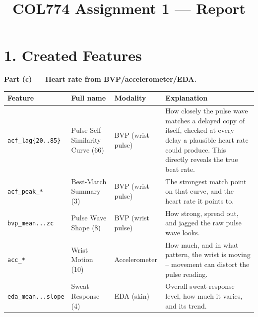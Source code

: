 \documentclass[10pt]{article}
\title{\vspace{-1.5em}COL774 Assignment 1 --- Report}
\author{}
\date{}
\begin{document}
\maketitle
\vspace{-3em}

\section*{1. Created Features}

\textbf{Part (c) --- Heart rate from BVP/accelerometer/EDA.}
\begin{center}
\footnotesize
\begin{tabular}{lp{2.5cm}lp{6.5cm}}
\toprule
Feature & Full name & Modality & Explanation \\
\midrule
\texttt{acf\_lag\{20..85\}} & Pulse Self-Similarity Curve (66) & BVP (wrist pulse) & How closely the pulse wave matches a delayed copy of itself, checked at every delay a plausible heart rate could produce. This directly reveals the true beat rate. \\
\texttt{acf\_peak\_*} & Best-Match Summary (3) & BVP (wrist pulse) & The strongest match point on that curve, and the heart rate it points to. \\
\texttt{bvp\_mean...zc} & Pulse Wave Shape (8) & BVP (wrist pulse) & How strong, spread out, and jagged the raw pulse wave looks. \\
\texttt{acc\_*} & Wrist Motion (10) & Accelerometer & How much, and in what pattern, the wrist is moving -- movement can distort the pulse reading. \\
\texttt{eda\_mean...slope} & Sweat Response (4) & EDA (skin) & Overall sweat-response level, how much it varies, and its trend. \\
\bottomrule
\end{tabular}
\end{center}
\end{document}
